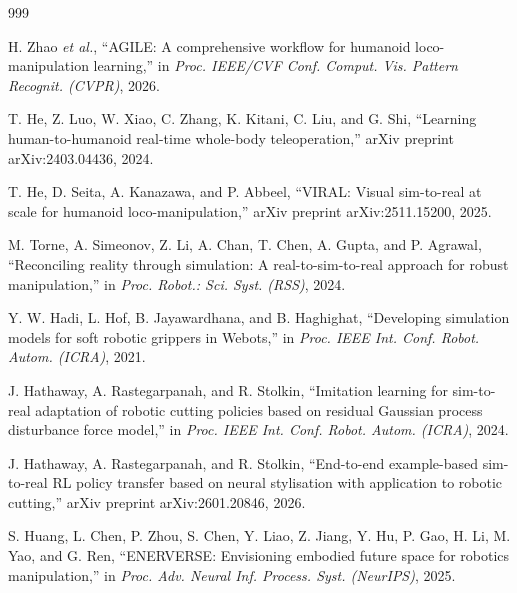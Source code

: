 \documentclass[12pt,a4paper,oneside]{report}
\begin{document}
\begin{thebibliography}{999}

H. Zhao \textit{et al.}, ``{AGILE}: A comprehensive workflow for humanoid loco-manipulation learning,'' in \textit{Proc. IEEE/CVF Conf. Comput. Vis. Pattern Recognit. (CVPR)}, 2026.




T. He, Z. Luo, W. Xiao, C. Zhang, K. Kitani, C. Liu, and G. Shi, ``Learning human-to-humanoid real-time whole-body teleoperation,'' arXiv preprint arXiv:2403.04436, 2024.




T. He, D. Seita, A. Kanazawa, and P. Abbeel, ``{VIRAL}: Visual sim-to-real at scale for humanoid loco-manipulation,'' arXiv preprint arXiv:2511.15200, 2025.




M. Torne, A. Simeonov, Z. Li, A. Chan, T. Chen, A. Gupta, and P. Agrawal, ``Reconciling reality through simulation: A real-to-sim-to-real approach for robust manipulation,'' in \textit{Proc. Robot.: Sci. Syst. (RSS)}, 2024.




Y. W. Hadi, L. Hof, B. Jayawardhana, and B. Haghighat, ``Developing simulation models for soft robotic grippers in Webots,'' in \textit{Proc. IEEE Int. Conf. Robot. Autom. (ICRA)}, 2021.




J. Hathaway, A. Rastegarpanah, and R. Stolkin, ``Imitation learning for sim-to-real adaptation of robotic cutting policies based on residual Gaussian process disturbance force model,'' in \textit{Proc. IEEE Int. Conf. Robot. Autom. (ICRA)}, 2024.




J. Hathaway, A. Rastegarpanah, and R. Stolkin, ``End-to-end example-based sim-to-real {RL} policy transfer based on neural stylisation with application to robotic cutting,'' arXiv preprint arXiv:2601.20846, 2026.




S. Huang, L. Chen, P. Zhou, S. Chen, Y. Liao, Z. Jiang, Y. Hu, P. Gao, H. Li, M. Yao, and G. Ren, ``{ENERVERSE}: Envisioning embodied future space for robotics manipulation,'' in \textit{Proc. Adv. Neural Inf. Process. Syst. (NeurIPS)}, 2025.




\end{thebibliography}
\end{document}
